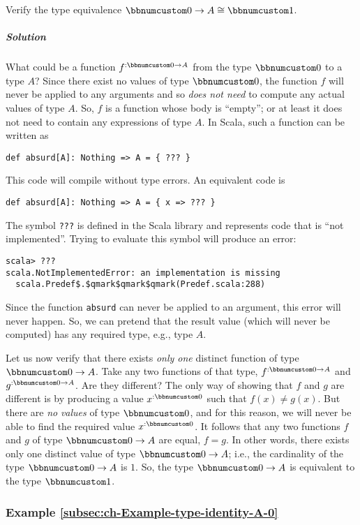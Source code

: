 Verify the type equivalence $\bbnum 0\rightarrow A\cong\bbnum 1$.

\subparagraph{Solution}

What could be a function $f^{:\bbnum 0\rightarrow A}$ from the type
$\bbnum 0$ to a type $A$? Since there exist no values of type $\bbnum 0$,
the function $f$ will never be applied to any arguments and so \emph{does
not need} to compute any actual values of type $A$. So, $f$ is a
function whose body is \textsf{``}empty\textsf{''}; or at least it does not need to
contain any expressions of type $A$. In Scala, such a function can
be written as
\begin{lstlisting}
def absurd[A]: Nothing => A = { ??? }
\end{lstlisting}
This code will compile without type errors. An equivalent code is
\begin{lstlisting}
def absurd[A]: Nothing => A = { x => ??? }
\end{lstlisting}
The symbol \lstinline!???! is defined in the Scala library and represents
code that is \textsf{``}not implemented\textsf{''}. Trying to evaluate this symbol
will produce an error:
\begin{lstlisting}
scala> ???
scala.NotImplementedError: an implementation is missing
  scala.Predef$.$qmark$qmark$qmark(Predef.scala:288) 
\end{lstlisting}
Since the function \lstinline!absurd! can never be applied to an
argument, this error will never happen. So, we can pretend that the
result value (which will never be computed) has any required type,
e.g., type $A$.

Let us now verify that there exists \emph{only one} distinct function
of type $\bbnum 0\rightarrow A$. Take any two functions of that type,
$f^{:\bbnum 0\rightarrow A}$ and $g^{:\bbnum 0\rightarrow A}$. Are
they different? The only way of showing that $f$ and $g$ are different
is by producing a value $x^{:\bbnum 0}$ such that $f(x)\neq g(x)$.
But there are \emph{no} \emph{values} of type $\bbnum 0$, and for
this reason, we will never be able to find the required value $x^{:\bbnum 0}$.
It follows that any two functions $f$ and $g$ of type $\bbnum 0\rightarrow A$
are equal, $f=g$. In other words, there exists only one distinct
value of type $\bbnum 0\rightarrow A$; i.e., the cardinality of the
type $\bbnum 0\rightarrow A$ is $1$. So, the type $\bbnum 0\rightarrow A$
is equivalent to the type $\bbnum 1$.

\subsubsection{Example \label{subsec:ch-Example-type-identity-A-0}\ref{subsec:ch-Example-type-identity-A-0}}

